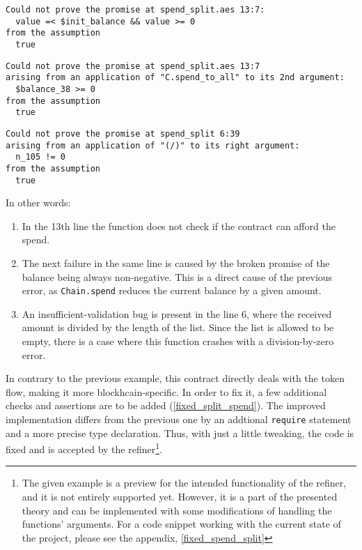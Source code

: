 \begin{Verbatim}[samepage=true]
Could not prove the promise at spend_split.aes 13:7:
  value =< $init_balance && value >= 0
from the assumption
  true
\end{Verbatim}
\begin{Verbatim}[samepage=true]
Could not prove the promise at spend_split.aes 13:7
arising from an application of "C.spend_to_all" to its 2nd argument:
  $balance_38 >= 0
from the assumption
  true
\end{Verbatim}
\begin{Verbatim}[samepage=true]
Could not prove the promise at spend_split 6:39
arising from an application of "(/)" to its right argument:
  n_105 != 0
from the assumption
  true
\end{Verbatim}

In other words:

\begin{enumerate}
\item In the 13th line the function does not check if the contract can afford
  the spend.
\item The next failure in the same line is caused by the broken promise of the
  balance being always non-negative. This is a direct cause of the previous
  error, as \texttt{Chain.spend} reduces the current balance by a given amount.
\item An insufficient-validation bug is present in the line 6, where the
  received amount is divided by the length of the list. Since the list is
  allowed to be empty, there is a case where this function crashes with a
  division-by-zero error.
\end{enumerate}

In contrary to the previous example, this contract directly deals with the token
flow, making it more blockhcain-specific. In order to fix it, a few additional
checks and assertions are to be added (\autoref{fixed_split_spend}). The
improved implementation differs from the previous one by an addtional
\texttt{require} statement and a more precise type declaration. Thus, with just
a little tweaking, the code is fixed and is accepted by the refiner\footnote{The
  given example is a preview for the intended functionality of the refiner, and
  it is not entirely supported yet. However, it is a part of the presented
  theory and can be implemented with some modifications of handling the
  functions' arguments. For a code snippet working with the current state of the
  project, please see the appendix, \autoref{fixed_spend_split}}.

